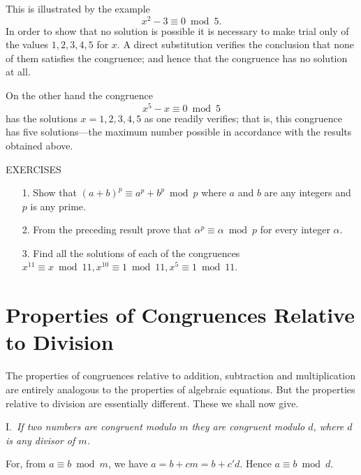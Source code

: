 \documentclass[oneside]{book}
\begin{document}
This is illustrated by the example
\begin{equation*}
x^2 - 3 \equiv 0 \bmod 5.
\end{equation*}
In order to show that no solution is possible it is necessary to
make trial only of the values $1, 2, 3, 4, 5$ for $x$. A direct
substitution verifies the conclusion that none of them satisfies the
congruence; and hence that the congruence has no solution at all.

On the other hand the congruence
\begin{equation*}
x^5 - x \equiv 0 \bmod 5
\end{equation*}
has the solutions $x = 1, 2, 3, 4, 5$ as one readily verifies; that
is, this congruence has five solutions---the maximum number possible
in accordance with the results obtained above.

\begin{center}
EXERCISES
\end{center}

\small \begin{enumerate}
\item[1.] Show that $(a + b)^p \equiv  a^p + b^p \bmod p$
where $a$ and $b$ are any integers and $p$ is any prime.

\item[2.] From the preceding result prove that
$\alpha^p \equiv \alpha \bmod p$ for every integer $\alpha$.

\item[3.] Find all the solutions of each of the congruences $x^{11}
\equiv x \bmod 11, x^{10} \equiv 1 \bmod 11, x^{5} \equiv 1 \bmod
11$.
\end{enumerate} \normalsize{}

\section{Properties of Congruences Relative to Division}\label{s20}

The properties of congruences relative to addition, subtraction and
multiplication are entirely analogous to the properties of algebraic
equations. But the properties relative to division are essentially
different. These we shall now give.

\smallskip I.~\emph{If two numbers are congruent modulo $m$ they are
congruent modulo $d$, where $d$ is any divisor of $m$.}

For, from $a \equiv b \bmod m$, we have $a = b + cm = b + c'd$.
Hence $a\equiv b \bmod d$.
\end{document}
